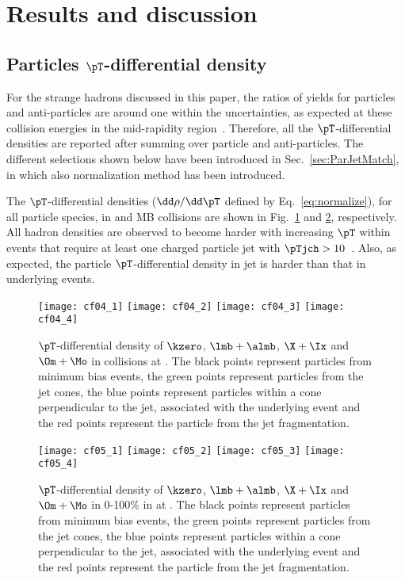 \documentclass[ALICE,manyauthors]{cernphprep}
\begin{document}
\section{Results and discussion}%
\label{sec:Results}

\subsection{Particles $\pT$-differential density}
\label{subsec:ParPtDensity}

For the strange hadrons discussed in this paper, the ratios of yields for particles and anti-particles are around one within the uncertainties, as expected at these collision energies in the mid-rapidity region~\cite{Acharya:2020uxl, ALICE:2015mpp}.
Therefore, all the $\pT$-differential densities are reported after summing over particle and anti-particles.
The different selections shown below have been introduced in Sec.~\ref{sec:ParJetMatch}, in which also normalization method has been introduced.

The $\pT$-differential densities ($\dd \rho/ \dd \pT$ defined by Eq.~\ref{eq:normalize}), for all particle species, in \pp and MB \pPb collisions are shown in Fig.~\ref{fig:ppSpect} and \ref{fig:pPbSpect}, respectively.
All hadron densities are observed to become harder with increasing $\pT$ within events that require at least one charged particle jet with $\pTjch > 10$~\GeVc.
Also, as expected, the particle $\pT$-differential density in jet is harder than that in underlying events.

\begin{figure}[!ht]
	\begin{center}
		\texttt{[image: cf04\_1]}
		\texttt{[image: cf04\_2]}
		\texttt{[image: cf04\_3]}
		\texttt{[image: cf04\_4]}
	\end{center}
	\caption{$\pT$-differential density of $\kzero$, $\lmb + \almb$, $\X + \Ix$ and $\Om + \Mo$ in \pp collisions at \thirteen. The black points represent particles from minimum bias events, the green points represent particles from the jet cones, the blue points represent particles within a cone perpendicular to the jet, associated with the underlying event and the red points represent the particle from the jet fragmentation.}
	\label{fig:ppSpect}
\end{figure}
\begin{figure}[!ht]
	\begin{center}
		\texttt{[image: cf05\_1]}
		\texttt{[image: cf05\_2]}
		\texttt{[image: cf05\_3]}
		\texttt{[image: cf05\_4]}
	\end{center}
	\caption{$\pT$-differential density of $\kzero$, $\lmb + \almb$, $\X + \Ix$ and $\Om + \Mo$ in 0-100\% in \pPb at \fivenn. The black points represent particles from minimum bias events, the green points represent particles from the jet cones, the blue points represent particles within a cone perpendicular to the jet, associated with the underlying event and the red points represent the particle from the jet fragmentation.}
	\label{fig:pPbSpect}
\end{figure}
\end{document}

